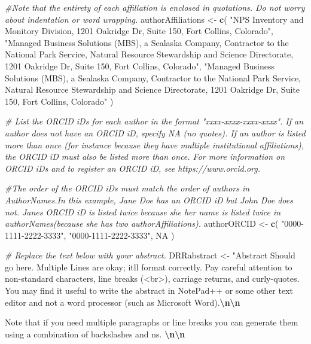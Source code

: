 \documentclass[
]{article}
\newenvironment{Shaded}{\begin{snugshade}}{\end{snugshade}}
\newcommand{\CommentTok}[1]{\textcolor[rgb]{0.56,0.35,0.01}{\textit{#1}}}
\newcommand{\ConstantTok}[1]{\textcolor[rgb]{0.56,0.35,0.01}{#1}}
\newcommand{\FunctionTok}[1]{\textcolor[rgb]{0.13,0.29,0.53}{\textbf{#1}}}
\newcommand{\NormalTok}[1]{#1}
\newcommand{\OtherTok}[1]{\textcolor[rgb]{0.56,0.35,0.01}{#1}}
\newcommand{\SpecialCharTok}[1]{\textcolor[rgb]{0.81,0.36,0.00}{\textbf{#1}}}
\newcommand{\StringTok}[1]{\textcolor[rgb]{0.31,0.60,0.02}{#1}}
\begin{document}
\begin{Shaded}
\begin{Highlighting}[]
\CommentTok{\#Note that the entirety of each affiliation is enclosed in quotations. Do not worry about indentation or word wrapping.}
\NormalTok{authorAffiliations }\OtherTok{\textless{}{-}} \FunctionTok{c}\NormalTok{(}
  \StringTok{"NPS Inventory and Monitory Division, 1201 Oakridge Dr, Suite 150, Fort Collins, Colorado"}\NormalTok{, }
  \StringTok{"Managed Business Solutions (MBS), a Sealaska Company, Contractor to the National Park Service, Natural Resource Stewardship and Science Directorate, 1201 Oakridge Dr, Suite 150, Fort Collins, Colorado"}\NormalTok{,}
  \StringTok{"Managed Business Solutions (MBS), a Sealaska Company, Contractor to the National Park Service, Natural Resource Stewardship and Science Directorate, 1201 Oakridge Dr, Suite 150, Fort Collins, Colorado"}
\NormalTok{)}

\CommentTok{\# List the ORCID iDs for each author in the format "xxxx{-}xxxx{-}xxxx{-}xxxx". If an author does not have an ORCID iD, specify NA (no quotes). If an author is listed more than once (for instance because they have multiple institutional affiliations), the ORCID iD must also be listed more than once. For more information on ORCID iDs and to register an ORCID iD, see https://www.orcid.org. }

\CommentTok{\#The order of the ORCID iDs must match the order of authors in AuthorNames.In this example, Jane Doe has an ORCID iD but John Doe does not. Jane\textquotesingle{}s ORCID iD is listed twice because she her name is listed twice in authorNames(because she has two authorAffiliations).}
\NormalTok{authorORCID }\OtherTok{\textless{}{-}} \FunctionTok{c}\NormalTok{(}
  \StringTok{"0000{-}1111{-}2222{-}3333"}\NormalTok{, }\StringTok{"0000{-}1111{-}2222{-}3333"}\NormalTok{, }\ConstantTok{NA}
\NormalTok{  )}

\CommentTok{\# Replace the text below with your abstract.}
\NormalTok{DRRabstract }\OtherTok{\textless{}{-}} \StringTok{"Abstract Should go here. Multiple Lines are okay; it\textquotesingle{}ll format correctly. Pay careful attention to non{-}standard characters, line breaks (\textless{}br\textgreater{}), carriage returns, and curly{-}quotes. You may find it useful to write the abstract in NotePad++ or some other text editor and not a word processor (such as Microsoft Word).}\SpecialCharTok{\textbackslash{}n\textbackslash{}n}

\StringTok{Note that if you need multiple paragraphs or line breaks you can generate them using a combination of backslashes and n\textquotesingle{}s. }\SpecialCharTok{\textbackslash{}n\textbackslash{}n}


\end{Highlighting}
\end{Shaded}
\end{document}
